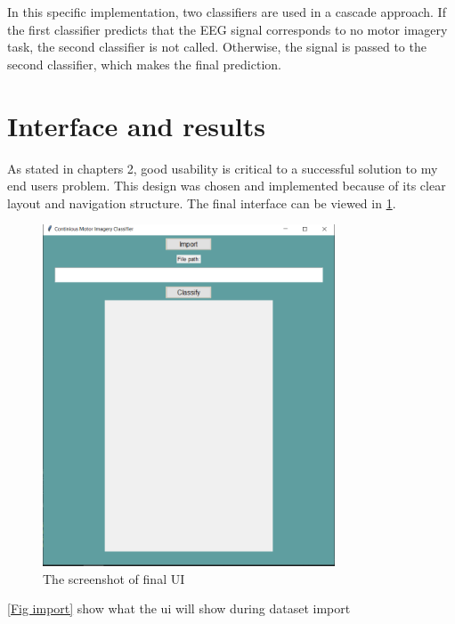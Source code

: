 \documentclass[12pt,a4paper]{report}
\begin{document}
	\justify In this specific implementation, two classifiers are used in a cascade approach. If the first classifier predicts that the EEG signal corresponds to no motor imagery task, the second classifier is not called. Otherwise, the signal is passed to the second classifier, which makes the final prediction.
	\section{Interface and results}
	\justify As stated in chapters 2, good usability is critical to a successful solution to my end users problem. This design was chosen and implemented because of its clear layout and navigation structure. The final interface can be viewed in \ref{Fig main_ui}.
	
	\begin{figure}[b]
		\centering 
		
		\includegraphics[height =4in]{1 (5).PNG}
		\caption{ The screenshot of final UI}
		\label{Fig main_ui}
	\end{figure}
	\justify \ref{Fig import} show what the ui will show during dataset import
\end{document}
